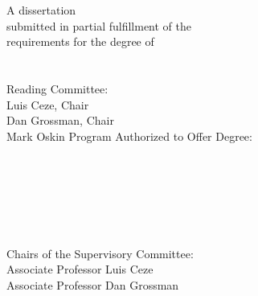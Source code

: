 \documentclass[ twoside,openright,titlepage,numbers=noenddot,headinclude,
                footinclude=true,cleardoublepage=empty,abstractoff,%
                BCOR=5mm,paper=letter,fontsize=11pt,letterpaper,%
                american,%
                ]{scrreprt}
\begin{document}
\raggedbottom
{}
\pagestyle{plain}


\begin{titlepage}
	\begin{addmargin}[-1cm]{-3cm}
    \begin{center}
        \large
        \hfill
        \vfill
        \begingroup
            \color{Violet} \\
            \color{Violet} \\ \bigskip
        \endgroup
        \vfill
        A dissertation \\
        submitted in partial fulfillment of the \\
        requirements for the degree of \\
        \medskip
         \\
        \bigskip
         \\
        \smallskip
        \vfill
        Reading Committee: \\
        \smallskip
        Luis Ceze, Chair \\
        \smallskip
        Dan Grossman, Chair \\
        \smallskip
        Mark Oskin
        \vfill
        Program Authorized to Offer Degree: \\
        \smallskip
    \end{center}
  \end{addmargin}
\end{titlepage}


\cleardoublepage
\thispagestyle{empty}
\begin{center}
    \vspace*{20ex}
    \textcopyright\  \\
    \bigskip
\end{center}


\cleardoublepage
\thispagestyle{empty}

\begin{center}
     \\
    \bigskip
    {\color{Violet}
     \\
     \\
    }
    \bigskip
     \\
    \bigskip
    Chairs of the Supervisory Committee: \\
    Associate Professor Luis Ceze \\
    Associate Professor Dan Grossman \\
     \\
    \bigskip
\end{center}
\end{document}
